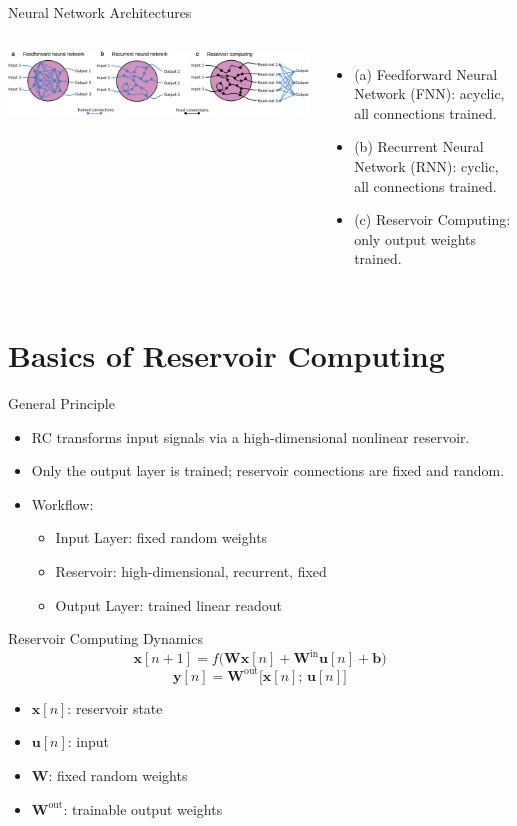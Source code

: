 \documentclass{beamer}
\begin{document}
\begin{frame}{Neural Network Architectures}
  \begin{columns}
    \includegraphics[width=\linewidth]{figures/rc_difference_with others.png}
    \begin{itemize}
      \item (a) Feedforward Neural Network (FNN): acyclic, all connections trained.
      \item (b) Recurrent Neural Network (RNN): cyclic, all connections trained.
      \item (c) Reservoir Computing: only output weights trained.
    \end{itemize}
  \end{columns}
\end{frame}

\section{Basics of Reservoir Computing}
\begin{frame}{General Principle}
  \begin{itemize}
    \item RC transforms input signals via a high-dimensional nonlinear reservoir.
    \item Only the output layer is trained; reservoir connections are fixed and random.
    \item Workflow:
      \begin{itemize}
        \item Input Layer: fixed random weights
        \item Reservoir: high-dimensional, recurrent, fixed
        \item Output Layer: trained linear readout
      \end{itemize}
  \end{itemize}
\end{frame}

\begin{frame}{Reservoir Computing Dynamics}
  \[
    \mathbf{x}[n+1] = f\bigl(\mathbf{W}\mathbf{x}[n] + \mathbf{W}^{\mathrm{in}}\mathbf{u}[n] + \mathbf{b}\bigr)
  \]
  \[
    \mathbf{y}[n] = \mathbf{W}^{\mathrm{out}}\bigl[\mathbf{x}[n];\,\mathbf{u}[n]\bigr]
  \]
  \begin{itemize}
    \item $\mathbf{x}[n]$: reservoir state
    \item $\mathbf{u}[n]$: input
    \item $\mathbf{W}$: fixed random weights
    \item $\mathbf{W}^{\mathrm{out}}$: trainable output weights
  \end{itemize}
\end{frame}
\end{document}
